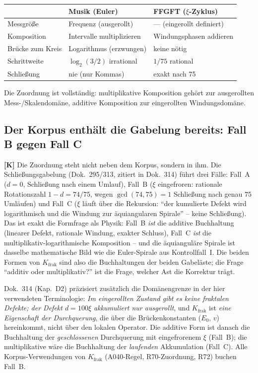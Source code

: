 \begin{center}
\begin{tabular}{lll}
\toprule
 & Musik (Euler) & FFGFT ($\xi$-Zyklus) \\
\midrule
Messgr\"o\ss e & Frequenz (ausgerollt) & --- (eingerollt definiert) \\
Komposition & Intervalle multiplizieren & Windungsphasen addieren \\
Br\"ucke zum Kreis & Logarithmus (erzwungen) & keine n\"otig \\
Schrittweite & $\log_2(3/2)$ irrational & $1/75$ rational \\
Schlie\ss ung & nie (nur Kommas) & exakt nach 75 \\
\bottomrule
\end{tabular}
\end{center}

Die Zuordnung ist vollst\"andig: multiplikative Komposition geh\"ort zur
ausgerollten Mess-/Skalendom\"ane, additive Komposition zur eingerollten
Windungsdom\"ane.

\subsection{Der Korpus enth\"alt die Gabelung bereits: Fall B gegen Fall C}

\textbf{[K]} Die Zuordnung steht nicht neben dem Korpus, sondern in ihm.
Die Schlie\ss ungsgabelung (Dok.~295/313, zitiert in Dok.~314) f\"uhrt
drei F\"alle: Fall~A ($d=0$, Schlie\ss ung nach einem Umlauf), Fall~B
($\xi$ eingefroren: rationale Rotationszahl $1-d = 74/75$, wegen
$\gcd(74,75)=1$ Schlie\ss ung nach genau $75$ Uml\"aufen) und Fall~C
($\xi$ l\"auft \"uber die Rekursion: \enquote{der kumulierte Defekt wird
logarithmisch und die Windung zur \"aquiangularen Spirale} -- keine
Schlie\ss ung). Das ist exakt die Formfrage als Physik: Fall~B
\emph{ist} die additive Buchhaltung (linearer Defekt, rationale
Windung, exakter Schluss), Fall~C \emph{ist} die
multiplikativ-logarithmische Komposition -- und die \"aquianguläre
Spirale ist dasselbe mathematische Bild wie die Euler-Spirale aus
Kontrollfall~I. Die beiden Formen von $K_\text{frak}$ sind also die
Buchhaltungen der beiden Gabel\"aste; die Frage \enquote{additiv oder
multiplikativ?} ist die Frage, welcher Ast die Korrektur tr\"agt.

Dok.~314 (Kap.~D2) pr\"azisiert zus\"atzlich die Dom\"anengrenze in der
hier verwendeten Terminologie: \emph{Im eingerollten Zustand gibt es
keine fraktalen Defekte; der Defekt $d = 100\xi$ akkumuliert nur
ausgerollt}, und $K_\text{frak}$ ist \emph{eine Eigenschaft der
Durchquerung}, die \"uber die Br\"uckenkonstanten ($E_0$, $v$)
hereinkommt, nicht \"uber den lokalen Operator. Die additive Form ist
danach die Buchhaltung der \emph{geschlossenen} Durchquerung mit
eingefrorenem $\xi$ (Fall~B); die multiplikative w\"are die Buchhaltung
der \emph{laufenden} Akkumulation (Fall~C). Alle
Korpus-Verwendungen von $K_\text{frak}$ (A040-Regel, R70-Zuordnung,
R72) buchen Fall~B.

